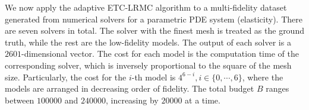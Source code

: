 \documentclass[11pt,a4paper]{amsart}
\numberwithin{equation}{section}
\theoremstyle{plain}
\theoremstyle{definition}
\begin{document}
%

We now apply the adaptive ETC-LRMC algorithm to a multi-fidelity dataset generated from numerical solvers for a parametric PDE system (elasticity). 
There are seven solvers in total. 
The solver with the finest mesh is treated as the ground truth, while the rest are the low-fidelity models. 
The output of each solver is a $2601$-dimensional vector. 
The cost for each model is the computation time of the corresponding solver, which is inversely proportional to the square of the mesh size. 
Particularly, the cost for the $i$-th model is $4^{6-i}, i\in \{0,\cdots, 6\}$, where the models are arranged in decreasing order of fidelity.  
The total budget $B$ ranges between $100000$ and $240000$, increasing by $20000$ at a time. 
\end{document}
